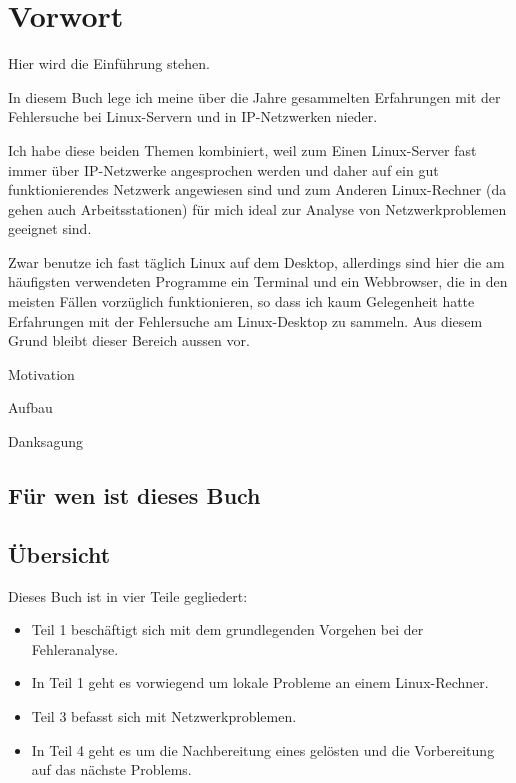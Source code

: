 \chapter{Vorwort}
\label{cha:vorwort}

\begin{abstractsec}
  Hier wird die Einführung stehen.
\end{abstractsec}
\begin{normaltext}
  In diesem Buch lege ich meine über die Jahre gesammelten Erfahrungen mit
  der Fehlersuche bei Linux-Servern und in IP-Netzwerken nieder.

  Ich habe diese beiden Themen kombiniert, weil zum Einen Linux-Server fast
  immer über IP-Netzwerke angesprochen werden und daher auf ein gut
  funktionierendes Netzwerk angewiesen sind und zum Anderen Linux-Rechner
  (da gehen auch Arbeitsstationen) für mich ideal zur Analyse von
  Netzwerkproblemen geeignet sind.

  Zwar benutze ich fast täglich Linux auf dem Desktop, allerdings sind hier
  die am häufigsten verwendeten Programme ein Terminal und ein Webbrowser, die
  in den meisten Fällen vorzüglich funktionieren, so dass ich kaum Gelegenheit
  hatte Erfahrungen mit der Fehlersuche am Linux-Desktop zu sammeln. Aus
  diesem Grund bleibt dieser Bereich aussen vor.
\end{normaltext}
\begin{notes}
\item Motivation
\item Aufbau
\item Danksagung
\end{notes}

\section*{Für wen ist dieses Buch}
\label{sec:fuerwen}

\begin{normaltext}
\end{normaltext}

\section*{Übersicht}
\label{sec:ubersicht}

\begin{normaltext}
  Dieses Buch ist in vier Teile gegliedert:
  \begin{itemize}
  \item Teil 1 beschäftigt sich mit dem grundlegenden Vorgehen bei der
    Fehleranalyse.
  \item In Teil 1 geht es vorwiegend um lokale Probleme an einem
    Linux-Rechner.
  \item Teil 3 befasst sich mit Netzwerkproblemen.
  \item In Teil 4 geht es um die Nachbereitung eines gelösten und die
    Vorbereitung auf das nächste Problems.
  \end{itemize}
\end{normaltext}

